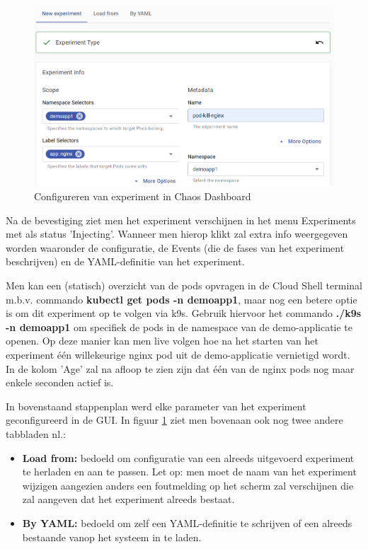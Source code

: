 \begin{figure}[h]
    \centering
    \includegraphics[scale=.7]{img/experiment-info.png}
    \caption{Configureren van experiment in Chaos Dashboard}
    \label{img:config-in-dashboard}
\end{figure}

Na de bevestiging ziet men het experiment verschijnen in het menu Experiments met als status 'Injecting'. Wanneer men hierop klikt zal extra info weergegeven worden waaronder de configuratie, de Events (die de fases van het experiment beschrijven) en de YAML-definitie van het experiment. 

Men kan een (statisch) overzicht van de pods opvragen in de Cloud Shell terminal m.b.v. commando {\bf kubectl get pods -n demoapp1}, maar nog een betere optie is om dit experiment op te volgen via k9s. Gebruik hiervoor het commando {\bf ./k9s -n demoapp1} om specifiek de pods in de namespace van de demo-applicatie te openen. Op deze manier kan men live volgen hoe na het starten van het experiment één willekeurige nginx pod uit de demo-applicatie vernietigd wordt.
In de kolom 'Age' zal na afloop te zien zijn dat één van de nginx pods nog maar enkele seconden actief is. 

In bovenstaand stappenplan werd elke parameter van het experiment geconfigureerd in de GUI. In figuur \ref{img:config-in-dashboard} ziet men bovenaan ook nog twee andere tabbladen nl.:
\begin{itemize}
    \item {\bf Load from:} bedoeld om configuratie van een alreeds uitgevoerd experiment te herladen en aan te passen. Let op: men moet de naam van het experiment wijzigen aangezien anders een foutmelding op het scherm zal verschijnen die zal aangeven dat het experiment alreeds bestaat.
    \item {\bf By YAML:} bedoeld om zelf een YAML-definitie te schrijven of een alreeds bestaande vanop het systeem in te laden.
\end{itemize} 

